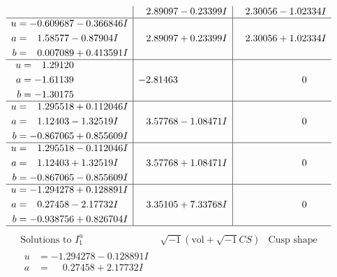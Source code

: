 \documentclass[1p]{elsarticle_modified}
\theoremstyle{definition}
\newcommand{\I}{\sqrt{-1}}
\begin{document}
$$\begin{array}{c|c|c}
 & \phantom{-}2.89097 - 0.23399 I & \phantom{-}2.30056 - 1.02334 I \\ \hline\begin{aligned}
u &= -0.609687 - 0.366846 I \\
a &= \phantom{-}1.58577 - 0.87904 I \\
b &= \phantom{-}0.007089 + 0.413591 I\end{aligned}
 & \phantom{-}2.89097 + 0.23399 I & \phantom{-}2.30056 + 1.02334 I \\ \hline\begin{aligned}
u &= \phantom{-}1.29120\phantom{ +0.000000I} \\
a &= -1.61139\phantom{ +0.000000I} \\
b &= -1.30175\phantom{ +0.000000I}\end{aligned}
 & -2.81463\phantom{ +0.000000I} & \phantom{-0.000000 } 0 \\ \hline\begin{aligned}
u &= \phantom{-}1.295518 + 0.112046 I \\
a &= \phantom{-}1.12403 - 1.32519 I \\
b &= -0.867065 + 0.855609 I\end{aligned}
 & \phantom{-}3.57768 - 1.08471 I & \phantom{-0.000000 } 0 \\ \hline\begin{aligned}
u &= \phantom{-}1.295518 - 0.112046 I \\
a &= \phantom{-}1.12403 + 1.32519 I \\
b &= -0.867065 - 0.855609 I\end{aligned}
 & \phantom{-}3.57768 + 1.08471 I & \phantom{-0.000000 } 0 \\ \hline\begin{aligned}
u &= -1.294278 + 0.128891 I \\
a &= \phantom{-}0.27458 - 2.17732 I \\
b &= -0.938756 + 0.826704 I\end{aligned}
 & \phantom{-}3.35105 + 7.33768 I & \phantom{-0.000000 } 0\\
 \hline 
 \end{array}$$\newpage$$\begin{array}{c|c|c}  
\text{Solutions to }I^u_{1}& \I (\text{vol} + \sqrt{-1}CS) & \text{Cusp shape}\\
 \hline 
\begin{aligned}
u &= -1.294278 - 0.128891 I \\
a &= \phantom{-}0.27458 + 2.17732 I \\

\end{aligned}
\end{array}$$
\end{document}
